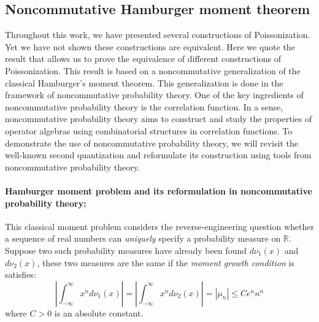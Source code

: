 \documentclass[a4paper,11pt]{article}
\theoremstyle{definition}
\numberwithin{equation}{section}
\begin{document}
\subsection{Noncommutative Hamburger moment theorem}\label{appendix:hamburger}

Throughout this work, we have presented several constructions of Poissonization. Yet we have not shown these constructions are equivalent. Here we quote the result that allows us to prove the equivalence of different constructions of Poissonization. This result is based on a noncommutative generalization of the classical Hamburger's moment theorem\cite{MAW}. This generalization is done in the framework of noncommutative probability theory\cite{quantStoch}. One of the key ingredients of noncommutative probability theory is the correlation function. In a sense, noncommutative probability theory aims to construct and study the properties of operator algebras using combinatorial structures in correlation functions. To demonstrate the use of noncommutative probability theory, we will revisit the well-known second quantization and reformulate its construction using tools from noncommutative probability theory. 

\paragraph{Hamburger moment problem and its reformulation in noncommutative probability theory:} This classical moment problem considers the reverse-engineering question whether a sequence of real numbers can \textit{uniquely} specify a probability measure on $\mathbb{R}$. Suppose two such probability measures have already been found $d\nu_1(x)$ and $d\nu_2(x)$, these two measures are the same if the \textit{moment growth condition} is satisfies:
\begin{equation}
    |\int_{-\infty}^\infty x^nd\nu_1(x)| = |\int_{-\infty}^\infty x^nd\nu_2(x)| = |\mu_n| \leq Ce^nn^n
\end{equation}
where $C>0$ is an absolute constant.
\end{document}
